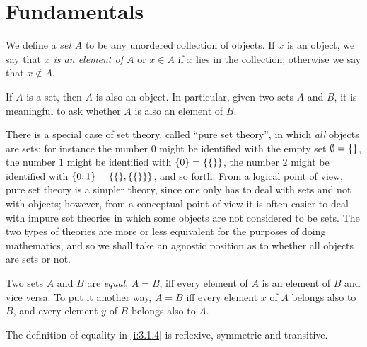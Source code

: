 \section{Fundamentals}\label{i:sec:3.1}

\begin{defn}\label{i:3.1.1}
  We define a \emph{set} \(A\) to be any unordered collection of objects.
  If \(x\) is an object, we say that \emph{\(x\) is an element of \(A\)} or \(x \in A\) if \(x\) lies in the collection;
  otherwise we say that \(x \notin A\).
\end{defn}

\begin{ax}\label{i:3.1}
  If \(A\) is a set, then \(A\) is also an object.
  In particular, given two sets \(A\) and \(B\), it is meaningful to ask whether \(A\) is also an element of \(B\).
\end{ax}

\setcounter{thm}{2}
\begin{rmk}\label{i:3.1.3}
  There is a special case of set theory, called ``pure set theory'', in which \emph{all} objects are sets;
  for instance the number \(0\) might be identified with the empty set \(\emptyset = \left\lbrace\right\rbrace\), the number \(1\) might be identified with \(\left\lbrace0\right\rbrace = \left\lbrace\left\lbrace\right\rbrace\right\rbrace\), the number \(2\) might be identified with \(\set{0, 1} = \set{\set{}, \set{\set{}}}\), and so forth.
  From a logical point of view, pure set theory is a simpler theory, since one only has to deal with sets and not with objects;
  however, from a conceptual point of view it is often easier to deal with impure set theories in which some objects are not considered to be sets.
  The two types of theories are more or less equivalent for the purposes of doing mathematics, and so we shall take an agnostic position as to whether all objects are sets or not.
\end{rmk}

\begin{defn}\label{i:3.1.4}
  Two sets \(A\) and \(B\) are \emph{equal}, \(A = B\), iff every element of \(A\) is an element of \(B\) and vice versa.
  To put it another way, \(A = B\) iff every element \(x\) of \(A\) belongs also to \(B\), and every element \(y\) of \(B\) belongs also to \(A\).
\end{defn}

\begin{ac}\label{i:ac:3.1.1}
  The definition of equality in \cref{i:3.1.4} is reflexive, symmetric and transitive.
\end{ac}

